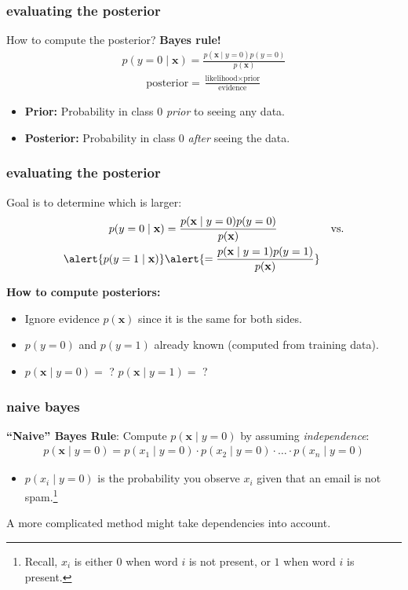 \documentclass[handout,compress]{beamer}
\newcommand{\bv}[1]{\mathbf{#1}}
\begin{document}
\begin{frame}
	\frametitle{evaluating the posterior}
	How to compute the posterior? \textbf{Bayes rule!}
	\begin{align}
		p(y=0 \mid \bv{x}) = \frac{p(\bv{x}\mid y=0)p(y=0)}{p(\bv{x})}
	\end{align}
	\begin{align}
	\text{posterior} = \frac{\text{likelihood}\times \text{prior}}{\text{evidence}}
	\end{align}
	\begin{itemize}
		\item \textbf{Prior:} Probability in class $0$ \emph{prior} to seeing any data.
		\item \textbf{Posterior:} Probability in class $0$ \emph{after} seeing the data.
	\end{itemize}
\end{frame}

\begin{frame}
	\frametitle{evaluating the posterior}
Goal is to determine which is larger:
\begin{align*}
p(y=0 \mid \bv{x}) &= \frac{p(\bv{x}\mid y=0)p(y=0)}{p(\bv{x})} & &\text{vs.} \\ \alert{p(y=1 \mid \bv{x}) }&\alert{= \frac{p(\bv{x}\mid y=1)p(y=1)}{p(\bv{x})}}
\end{align*}

\textbf{How to compute posteriors:}
\begin{itemize}
	\item Ignore evidence $p(\bv{x})$ since it is the same for both sides.
	\item $p(y=0)$ and $p(y=1)$ already known (computed from training data).
	\item $p(\bv{x} \mid y=0)=$ ? $p(\bv{x} \mid y=1)=$ ?
\end{itemize}
\end{frame}

\begin{frame}
	\frametitle{naive bayes}
	\alert{\textbf{``Naive'' Bayes Rule}}: Compute $p(\bv{x} \mid y=0)$ by assuming \emph{independence}:
	\begin{align*}
	p(\bv{x} \mid y=0) = p({x}_1 \mid y=0) \cdot p({x}_2 \mid y=0) \cdot \ldots \cdot p({x}_n \mid y=0)
	\end{align*}

	\begin{itemize}
		\item $p({x}_i \mid y=0)$ is the probability you observe $x_i$ given that an email is not spam.\footnote{Recall, $x_i$ is either $0$ when word $i$ is not present, or $1$ when word $i$ is present.} 
	\end{itemize}

A more complicated method might take dependencies into account.
\end{frame}
\end{document}
